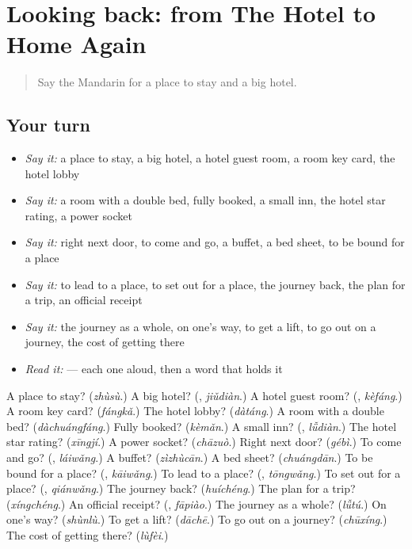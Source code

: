 \section[(dialogue)]{Looking back: from The Hotel to Home Again}

\label{lesson:ZH-R429-review-425-429}



\begin{quote}
Say the Mandarin for a place to stay and a big hotel.
\end{quote}

\subsection*{Your turn}
\begin{itemize}
\raggedright
  \item \emph{Say it:} a place to stay, a big hotel, a hotel guest room, a room key card, the hotel lobby
  \item \emph{Say it:} a room with a double bed, fully booked, a small inn, the hotel star rating, a power socket
  \item \emph{Say it:} right next door, to come and go, a buffet, a bed sheet, to be bound for a place
  \item \emph{Say it:} to lead to a place, to set out for a place, the journey back, the plan for a trip, an official receipt
  \item \emph{Say it:} the journey as a whole, on one's way, to get a lift, to go out on a journey, the cost of getting there
  \item \emph{Read it:}   — each one aloud, then a word that holds it
\end{itemize}

\begin{tcolorbox}[breakable,colback=teal!4,colframe=teal!35!black,title={Before you move on}]
A place to stay? (\emph{zhùsù}.) A big hotel? (\textbf{}, \emph{jiǔdiàn}.) A hotel guest room? (\textbf{}, \emph{kèfáng}.) A room key card? (\emph{fángkǎ}.) The hotel lobby? (\emph{dàtáng}.) A room with a double bed? (\emph{dàchuángfáng}.) Fully booked? (\emph{kèmǎn}.) A small inn? (\textbf{}, \emph{lǚdiàn}.) The hotel star rating? (\emph{xīngjí}.) A power socket? (\emph{chāzuò}.) Right next door? (\emph{gébì}.) To come and go? (\textbf{}, \emph{láiwǎng}.) A buffet? (\emph{zìzhùcān}.) A bed sheet? (\emph{chuángdān}.) To be bound for a place? (\textbf{}, \emph{kāiwǎng}.) To lead to a place? (\textbf{}, \emph{tōngwǎng}.) To set out for a place? (\textbf{}, \emph{qiánwǎng}.) The journey back? (\emph{huíchéng}.) The plan for a trip? (\emph{xíngchéng}.) An official receipt? (\textbf{}, \emph{fāpiào}.) The journey as a whole? (\emph{lǚtú}.) On one's way? (\emph{shùnlù}.) To get a lift? (\emph{dāchē}.) To go out on a journey? (\emph{chūxíng}.) The cost of getting there? (\emph{lùfèi}.)
\end{tcolorbox}
